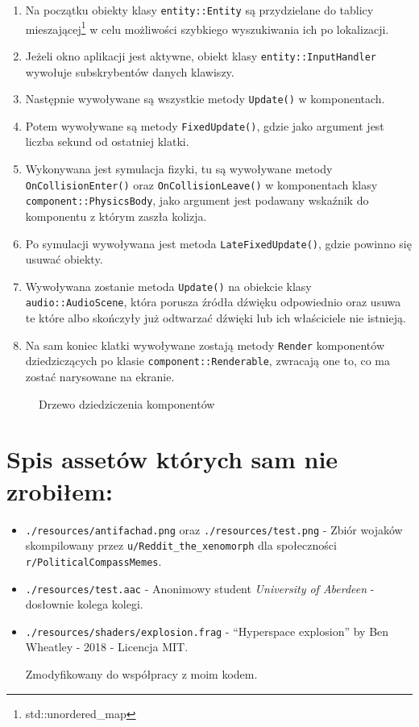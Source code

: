\documentclass[a4paper,11pt]{article}
\begin{document}
\begin{enumerate}
    \item Na początku obiekty klasy \texttt{entity::Entity} są przydzielane do tablicy mieszającej\footnote{std::unordered\_map} w celu możliwości szybkiego wyszukiwania ich po lokalizacji.
    \item Jeżeli okno aplikacji jest aktywne, obiekt klasy \texttt{entity::InputHandler} wywołuje subskrybentów danych klawiszy.
    \item Następnie wywoływane są wszystkie metody \texttt{Update()} w komponentach.
    \item Potem wywoływane są metody \texttt{FixedUpdate()}, gdzie jako argument jest liczba sekund od ostatniej klatki.
    \item Wykonywana jest symulacja fizyki, tu są wywoływane metody \texttt{OnCollisionEnter()} oraz \texttt{OnCollisionLeave()} w komponentach klasy \texttt{component::PhysicsBody}, jako argument jest podawany wskaźnik do komponentu z którym zaszła kolizja.
    \item Po symulacji wywoływana jest metoda \texttt{LateFixedUpdate()}, gdzie powinno się usuwać obiekty.
    \item Wywoływana zostanie metoda \texttt{Update()} na obiekcie klasy \texttt{audio::AudioScene}, która porusza źródła dźwięku odpowiednio oraz usuwa te które albo skończyły już odtwarzać dźwięki lub ich właściciele nie istnieją.
    \item Na sam koniec klatki wywoływane zostają metody \texttt{Render} komponentów dziedziczących po klasie \texttt{component::Renderable}, zwracają one to, co ma zostać narysowane na ekranie.
\end{enumerate}


\begin{figure}
    \resizebox{\textwidth}{!}{%
    }
    \centering
    \caption{Drzewo dziedziczenia komponentów}\label{rys:component}
\end{figure}

\section*{Spis assetów których sam nie zrobiłem:}

\begin{itemize}
    \item \texttt{./resources/antifachad.png} oraz \texttt{./resources/test.png} - Zbiór wojaków skompilowany przez \texttt{u/Reddit\_the\_xenomorph} dla społeczności \texttt{r/PoliticalCompassMemes}.
    \item \texttt{./resources/test.aac} - Anonimowy student \emph{University of Aberdeen} - dosłownie kolega kolegi.
    \item \texttt{./resources/shaders/explosion.frag} - ``Hyperspace explosion'' by Ben Wheatley - 2018 - Licencja MIT.
    
    Zmodyfikowany do współpracy z moim kodem.
\end{itemize}
\end{document}
